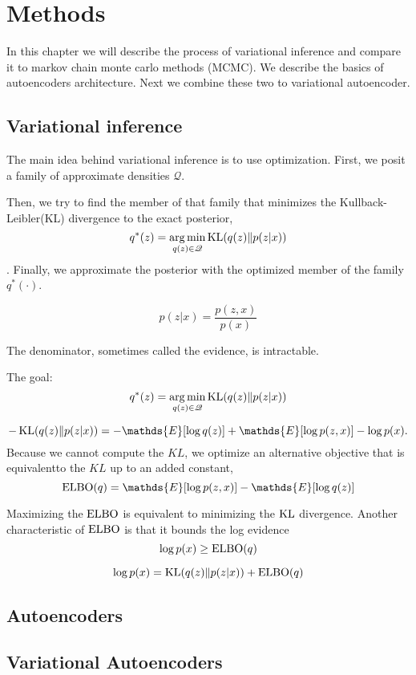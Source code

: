 \chapter{Methods}
\label{chap:methods}

In this chapter we will describe the process of variational inference and compare it to markov chain monte carlo methods (MCMC).
We describe the basics of autoencoders architecture.
Next we combine these two to variational autoencoder.

\section{Variational inference}
The main idea behind variational inference is to use optimization.
First, we posit a family of approximate densities $\mathscr{Q}$. \cite{blei2017statreview} 

Then, we try to find the member of that family that minimizes the Kullback-Leibler(KL) divergence to the exact posterior,
$$q^{\ast}(z) = \operatorname*{arg\,min}_{q(z) \in \mathscr{Q}} \operatorname{KL}(q(z) \| p(z|x))$$.
Finally, we approximate the posterior with the optimized member of the family $q^{\ast}(\cdot)$.

$$p(z|x)=\frac{p(z,x)}{p(x)}$$

The denominator, sometimes called the evidence, is intractable.

The goal:
$$
q^{\ast}(z) = \operatorname*{arg\,min}_{q(z) \in \mathscr{Q}} \operatorname{KL}(q(z) \| p(z|x))
$$

$$
- \KL(q(z) \| p(z|x)) = - \mathds{E}[\log q(z)] + \mathds{E}[\log p(z,x)] - \log p(x).
$$
Because we cannot compute the $KL$, we optimize an alternative objective that is equivalentto the $KL$ up to an added constant,
$$
\ELBO(q) = \mathds{E}[\log p(z,x)] - \mathds{E}[\log q(z)]
$$

Maximizing the $\operatorname{ELBO}$ is equivalent to minimizing the $\operatorname{KL}$ divergence.
Another characteristic of $\operatorname{ELBO}$ is that it bounds the log evidence
$$ \log p(x) \geq \operatorname{ELBO}(q) $$

$$ \log p(x) = \operatorname{KL}( q(z) \| p(z|x)) + \operatorname{ELBO}(q) $$

\section{Autoencoders}
\section{Variational Autoencoders}